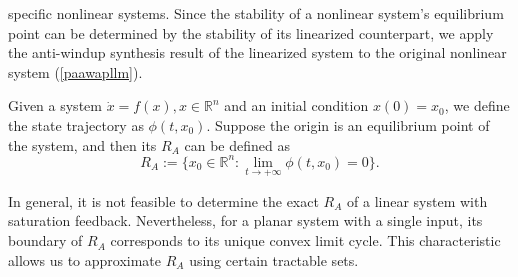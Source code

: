\documentclass[10pt,final,journal,twoside]{IEEEtran}
\begin{document}
specific nonlinear systems\cite{wen2011,hermann2010,yong2020}. Since the stability of a nonlinear system's equilibrium point can be determined by the stability
of its linearized counterpart\cite{bookofkhalil}, we apply the anti-windup synthesis result of the linearized system to the original nonlinear system (\ref{paawapllm}).

Given a system $\dot{x}=f(x),x\in\mathbb{R}^n$ and an initial condition $x(0)=x_0$, we define the state trajectory as $\phi(t,x_0)$. Suppose the origin is an equilibrium point of
the system, and then its $R_A$ can be defined as 
\[R_A:=\{x_0\in\mathbb{R}^n:\lim_{t\rightarrow+\infty}\phi(t,x_0)=0\}.\]\par
In general, it is not feasible to determine the exact $R_A$ of a linear system with saturation feedback. Nevertheless, for a planar system with a single input, its boundary of $R_A$ corresponds to its unique
convex limit cycle\cite{alvarez1993,bookofhu,bookofli}. This characteristic allows us to approximate $R_A$ using certain tractable sets.
\end{document}
